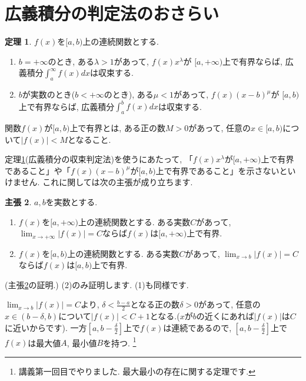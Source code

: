 \documentclass[dvipdfmx,a4paper,11pt]{article}
\theoremstyle{definition}
\newtheorem{thm}{定理}
\newtheorem{claim}[thm]{主張}
\begin{document}
\section{広義積分の判定法のおさらい}

  \begin{tcolorbox}[
    colback = white,
    colframe = green!35!black,
    fonttitle = \bfseries,
    breakable = true]
    \begin{thm}
    \label{kougi2}
$f(x)$を$[a,b)$上の連続関数とする.
\begin{enumerate}
\item $b=+ \infty$のとき, ある$\lambda >1$があって, $f(x)x^{\lambda}$が
$[a, +\infty)$上で有界ならば, 広義積分$\int_{a}^{\infty} f(x)dx $は収束する.
\item $b$が実数のとき($b <+ \infty$のとき), ある$\mu <1$があって, $f(x)(x-b)^{\mu}$が
$[a, b)$上で有界ならば, 広義積分$\int_{a}^{b} f(x)dx $は収束する.
\end{enumerate}
 \end{thm}
 \end{tcolorbox}
関数$f(x)$が$[a, b)$上で有界とは, ある正の数$M>0$があって, 任意の$x \in [a, b)$について$|f(x)| < M$となること.

\vspace{11pt}
定理\ref{kougi2}(広義積分の収束判定法)を使うにあたって, 
「$f(x)x^{\lambda}$が$[a, +\infty)$上で有界であること」や「$f(x)(x-b)^{\mu}$が$[a, b)$上で有界であること」を示さないといけません.
これに関しては次の主張が成り立ちます.
\begin{tcolorbox}[
    colback = white,
    colframe = green!35!black,
    fonttitle = \bfseries,
    breakable = true]
    \begin{claim}
    \label{cla2}
 $a,b$を実数とする.
  \begin{enumerate}
\item $f(x)$を$[a,+\infty)$上の連続関数とする.
ある実数$C$があって, $\lim_{x \rightarrow +\infty} |f(x)|=C$ならば$f(x)$は$[a,+\infty)$上で有界.
\item $f(x)$を$[a,b)$上の連続関数とする.
ある実数$C$があって, $\lim_{x \rightarrow b} |f(x)|=C$ならば$f(x)$は$[a,b)$上で有界.
  \end{enumerate}
 \end{claim}
 \end{tcolorbox}
 
 \hspace{-18pt}(主張\ref{cla2}の証明.)
 (2)のみ証明します. (1)も同様です.
 
 $\lim_{x \rightarrow b} |f(x)|=C$より, $\delta<\frac{b-a}{2}$となる正の数$\delta>0$があって, 任意の$x \in (b - \delta ,b)$について$|f(x)| < C+1$となる.($x$が$b$の近くにあれば$|f(x)|$は$C$に近いからです).
 一方$[a,b-\frac{\delta}{2}]$上で$f(x)$は連続であるので,
$[a,b-\frac{\delta}{2}]$上で$f(x)$は最大値$A$, 最小値$B$を持つ.
\footnote{講義第一回目でやりました. 最大最小の存在に関する定理です.}
\end{document}
